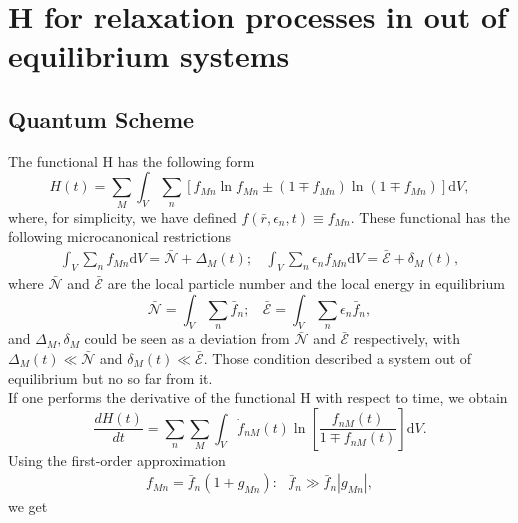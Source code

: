 \documentclass{article}
\begin{document}
\section{H for relaxation processes in out of equilibrium systems}


\subsection{Quantum Scheme}

The functional H has the following form
\begin{equation}
    H(t)=\sum_{M} \int_V\sum_{n} \left[ f_{Mn} \ln f_{Mn} \pm (1 \mp f_{Mn}) \ln (1 \mp f_{Mn}) \right]\mathrm{d}V \label{entropy2},
\end{equation}
where, for simplicity, we have defined $f(\bar{r},\epsilon_{n},t)\equiv f_{Mn}$.
These functional has the following microcanonical restrictions
\begin{eqnarray}
        \int_V\sum_{n}f_{Mn}\mathrm{d}V=\bar{\mathcal{N}}+\Delta_M(t); \ \ \ \ \int_V\sum_{n}\epsilon_{n}f_{Mn}\mathrm{d}V=\bar{\mathcal{E}}+ \delta_M(t), \label{restrictionoutside}
  \end{eqnarray}
  where $\bar {\mathcal{N}}$ and $\bar{\mathcal{E}}$ are the local particle number and the local energy in equilibrium
  \begin{equation}
      \bar{\mathcal{N}}=\int_V \sum_n \bar{f}_n; \ \ \ \ \bar{\mathcal{E}}=\int_V \sum_n \epsilon_n\bar{f}_n,
  \end{equation}
  and $\Delta_M,\delta_M$ could be seen as a deviation from $\bar{\mathcal{N}}$ and $\bar{\mathcal{E}}$ respectively, with $\Delta_M(t)\ll \bar{\mathcal{N}}$ and $\delta_M(t) \ll \bar{\mathcal{E}}$. Those condition described a system out of equilibrium but no so far from it.  \\
If one performs the derivative of the functional H with respect to time, we obtain
\begin{equation}
   \frac{dH(t)}{dt}= \sum_n \sum_M \int_{V}\dot{f}_{nM}(t)\ln \left[ \frac{f_{nM}(t)}{1\mp f_{nM}(t)} \right]\mathrm{d}V.\label{deltaH}
\end{equation}{}
Using the first-order approximation
\begin{eqnarray}
   f_{Mn}=\bar{f}_{n}(1+g_{Mn}): \ \ \ \bar{f}_{n}\gg \bar{f}_{n}|g_{Mn}|, \label{firstorder}
\end{eqnarray}{}
we get 
\end{document}
